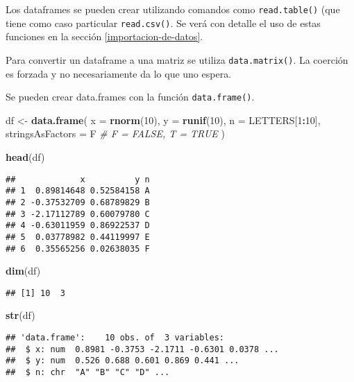 \documentclass[]{article}
\newenvironment{Shaded}{\begin{snugshade}}{\end{snugshade}}
\newcommand{\KeywordTok}[1]{\textcolor[rgb]{0.13,0.29,0.53}{\textbf{#1}}}
\newcommand{\DataTypeTok}[1]{\textcolor[rgb]{0.13,0.29,0.53}{#1}}
\newcommand{\DecValTok}[1]{\textcolor[rgb]{0.00,0.00,0.81}{#1}}
\newcommand{\StringTok}[1]{\textcolor[rgb]{0.31,0.60,0.02}{#1}}
\newcommand{\CommentTok}[1]{\textcolor[rgb]{0.56,0.35,0.01}{\textit{#1}}}
\newcommand{\OperatorTok}[1]{\textcolor[rgb]{0.81,0.36,0.00}{\textbf{#1}}}
\newcommand{\NormalTok}[1]{#1}
\begin{document}
Los dataframes se pueden crear utilizando comandos como
\texttt{read.table()} (que tiene como caso particular
\texttt{read.csv()}. Se verá con detalle el uso de estas funciones en la
sección \ref{importacion-de-datos}.

Para convertir un dataframe a una matriz se utiliza
\texttt{data.matrix()}. La coerción es forzada y no necesariamente da lo
que uno espera.

Se pueden crear data.frames con la función \texttt{data.frame()}.

\begin{Shaded}
\begin{Highlighting}[]
\NormalTok{df <-}\StringTok{ }\KeywordTok{data.frame}\NormalTok{(}
  \DataTypeTok{x =} \KeywordTok{rnorm}\NormalTok{(}\DecValTok{10}\NormalTok{),}
  \DataTypeTok{y =} \KeywordTok{runif}\NormalTok{(}\DecValTok{10}\NormalTok{),}
  \DataTypeTok{n =}\NormalTok{ LETTERS[}\DecValTok{1}\OperatorTok{:}\DecValTok{10}\NormalTok{],}
  \DataTypeTok{stringsAsFactors =}\NormalTok{ F }\CommentTok{# F = FALSE, T = TRUE}
\NormalTok{)}

\KeywordTok{head}\NormalTok{(df)}
\end{Highlighting}
\end{Shaded}

\begin{verbatim}
##             x          y n
## 1  0.89814648 0.52584158 A
## 2 -0.37532709 0.68789829 B
## 3 -2.17112789 0.60079780 C
## 4 -0.63011959 0.86922537 D
## 5  0.03778982 0.44119997 E
## 6  0.35565256 0.02638035 F
\end{verbatim}

\begin{Shaded}
\begin{Highlighting}[]
\KeywordTok{dim}\NormalTok{(df)}
\end{Highlighting}
\end{Shaded}

\begin{verbatim}
## [1] 10  3
\end{verbatim}

\begin{Shaded}
\begin{Highlighting}[]
\KeywordTok{str}\NormalTok{(df)}
\end{Highlighting}
\end{Shaded}

\begin{verbatim}
## 'data.frame':    10 obs. of  3 variables:
##  $ x: num  0.8981 -0.3753 -2.1711 -0.6301 0.0378 ...
##  $ y: num  0.526 0.688 0.601 0.869 0.441 ...
##  $ n: chr  "A" "B" "C" "D" ...
\end{verbatim}
\end{document}
